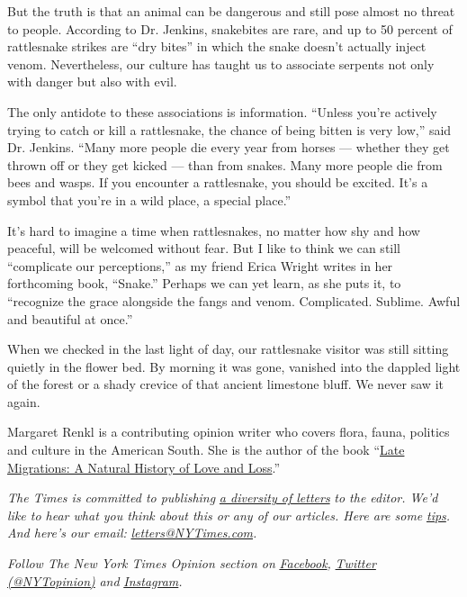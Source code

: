 But the truth is that an animal can be dangerous and still pose almost
no threat to people. According to Dr. Jenkins, snakebites are rare, and
up to 50 percent of rattlesnake strikes are ``dry bites'' in which the
snake doesn't actually inject venom. Nevertheless, our culture has
taught us to associate serpents not only with danger but also with evil.

The only antidote to these associations is information. ``Unless you're
actively trying to catch or kill a rattlesnake, the chance of being
bitten is very low,'' said Dr. Jenkins. ``Many more people die every
year from horses --- whether they get thrown off or they get kicked ---
than from snakes. Many more people die from bees and wasps. If you
encounter a rattlesnake, you should be excited. It's a symbol that
you're in a wild place, a special place.''

It's hard to imagine a time when rattlesnakes, no matter how shy and how
peaceful, will be welcomed without fear. But I like to think we can
still ``complicate our perceptions,'' as my friend Erica Wright writes
in her forthcoming book, ``Snake.'' Perhaps we can yet learn, as she
puts it, to ``recognize the grace alongside the fangs and venom.
Complicated. Sublime. Awful and beautiful at once.''

When we checked in the last light of day, our rattlesnake visitor was
still sitting quietly in the flower bed. By morning it was gone,
vanished into the dappled light of the forest or a shady crevice of that
ancient limestone bluff. We never saw it again.

Margaret Renkl is a contributing opinion writer who covers flora, fauna,
politics and culture in the American South. She is the author of the
book ``\href{https://milkweed.org/book/late-migrations}{Late Migrations:
A Natural History of Love and Loss}.''

\emph{The Times is committed to publishing}
\href{https://www.nytimes3xbfgragh.onion/2019/01/31/opinion/letters/letters-to-editor-new-york-times-women.html}{\emph{a
diversity of letters}} \emph{to the editor. We'd like to hear what you
think about this or any of our articles. Here are some}
\href{https://help.nytimes3xbfgragh.onion/hc/en-us/articles/115014925288-How-to-submit-a-letter-to-the-editor}{\emph{tips}}\emph{.
And here's our email:}
\href{mailto:letters@NYTimes.com}{\emph{letters@NYTimes.com}}\emph{.}

\emph{Follow The New York Times Opinion section on}
\href{https://www.facebookcorewwwi.onion/nytopinion}{\emph{Facebook}}\emph{,}
\href{http://twitter.com/NYTOpinion}{\emph{Twitter (@NYTopinion)}}
\emph{and}
\href{https://www.instagram.com/nytopinion/}{\emph{Instagram}}\emph{.}

